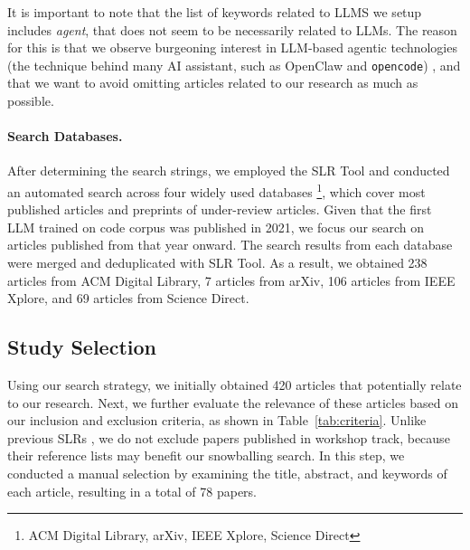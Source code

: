 \par It is important to note that the list of keywords related to 
LLMS we setup includes \textit{agent}, that does not seem to be
necessarily related to LLMs. The reason for this is that we observe 
burgeoning interest in LLM-based agentic technologies \citep{agents} (the technique
behind many AI assistant, such as OpenClaw and \texttt{opencode}) ,
and that we want to avoid omitting
articles related to our research as much as possible.

\paragraph*{Search Databases.} After determining the search strings, we
employed the SLR Tool\citep{slrtool} and conducted
an automated search across four widely used databases
\footnote{ACM Digital Library, arXiv, IEEE Xplore, Science Direct}, 
which cover most published
articles and preprints of under-review articles. Given that the first
LLM trained on code corpus was published in 2021\citep{codex}, 
we focus our search on articles
published from that year onward. The search results from each database were
merged and deduplicated with SLR Tool\citep{slrtool}.
As a result, we obtained 238 articles from ACM Digital Library, 
7 articles from arXiv, 106 articles from IEEE Xplore, 
and 69 articles from Science Direct.

\subsection{Study Selection}\label{subsec:stusel}

\par Using our search strategy, we initially obtained 420 articles
that potentially relate to our research. Next, we further 
evaluate the relevance of these articles based on our inclusion
and exclusion criteria, as shown in Table~\ref{tab:criteria}.
Unlike previous SLRs \citep{llm4se2}, we do not exclude papers
published in workshop track, because their reference lists
may benefit our snowballing search.
In this step, we conducted a manual selection by examining the 
title, abstract, and keywords of each article, resulting
in a total of 78 papers.

